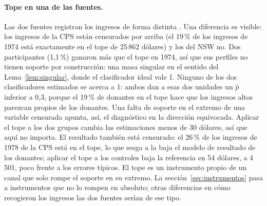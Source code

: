 \paragraph{Tope en una de las fuentes.} Las dos fuentes registran los ingresos de forma distinta \citep{smith2005}. Una diferencia es visible: los ingresos de la CPS están censurados por arriba (el 19\,\% de los ingresos de 1974 está exactamente en el tope de 25\,862 dólares) y los del NSW no. Dos participantes (1,1\,\%) ganaron más que el tope en 1974, así que sus perfiles no tienen soporte por construcción: una masa singular en el sentido del Lema~\ref{lem:singular}, donde el clasificador ideal vale 1. Ninguno de los dos clasificadores estimados se acerca a 1: ambos dan a esas dos unidades un $\hat p$ inferior a 0,3, porque el 19\,\% de donantes en el tope hace que los ingresos altos parezcan propios de los donantes. Una falta de soporte en el extremo de una variable censurada apunta, así, el diagnóstico en la dirección equivocada. Aplicar el tope a los dos grupos cambia las estimaciones menos de 30 dólares, así que aquí no importa. El resultado también está censurado: el 26\,\% de los ingresos de 1978 de la CPS está en el tope, lo que sesga a la baja el modelo de resultado de los donantes; aplicar el tope a los controles baja la referencia en 54 dólares, a 4\,501, poco frente a los errores típicos. El tope es un instrumento propio de un canal que solo rompe el soporte en su extremo. La sección~\ref{sec:instrumentos} pasa a instrumentos que no lo rompen en absoluto; otras diferencias en cómo recogieron los ingresos las dos fuentes serían de ese tipo.
